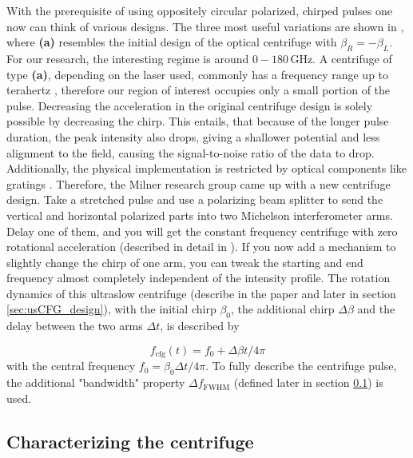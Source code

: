 With the prerequisite of using oppositely circular polarized, chirped pulses one now can think of various designs. The three most useful variations are shown in , where \textbf{(a)} resembles the initial design of the optical centrifuge \cite{karczmarekOpticalCentrifugeMolecules1999} with $\beta_R = -\beta_L$. For our research, the interesting regime is around $0-180\, \mathrm{GHz}$. A centrifuge of type \textbf{(a)}, depending on the laser used, commonly has a frequency range up to terahertz \cite{korobenkoThesis}, therefore our region of interest occupies only a small portion of the pulse. Decreasing the acceleration in the original centrifuge design is solely possible by decreasing the chirp. This entails, that because of the longer pulse duration, the peak intensity also drops, giving a shallower potential and less alignment to the field, causing the signal-to-noise ratio of the data to drop. Additionally, the physical implementation is restricted by optical components like gratings \cite{macphail-bartleyLaserControlMolecular2020}. Therefore, the Milner research group came up with a new centrifuge design. Take a stretched pulse and use a polarizing beam splitter to send the vertical and horizontal polarized parts into two Michelson interferometer arms. Delay one of them, and you will get the constant frequency centrifuge with zero rotational acceleration (described in detail in \cite{wangOpticalCentrifugeZero2025a}). If you now add a mechanism to slightly change the chirp of one arm, you can tweak the starting and end frequency almost completely independent of the intensity profile. The rotation dynamics of this ultraslow centrifuge (describe in the paper \cite{wangUltraslowOpticalCentrifuge2026} and later in section \ref{sec:usCFG_design}), with the initial chirp $\beta_0$, the additional chirp $\Delta \beta$ and the delay between the two arms $\Delta t$, is described by 

\begin{equation}f_{\mathrm{cfg}}(t) = f_0 + \Delta \beta t / 4 \pi
    \label{eq:f_uscfg}
\end{equation}
with the central frequency $f_0= \beta_0 \Delta t / 4 \pi$. To fully describe the centrifuge pulse, the additional "bandwidth" property $\Delta f_{\mathrm{FWHM}}$ (defined later in section \ref{sec:centrifuge_characterization}) is used.

\subsection{Characterizing the centrifuge}
\label{sec:centrifuge_characterization}

